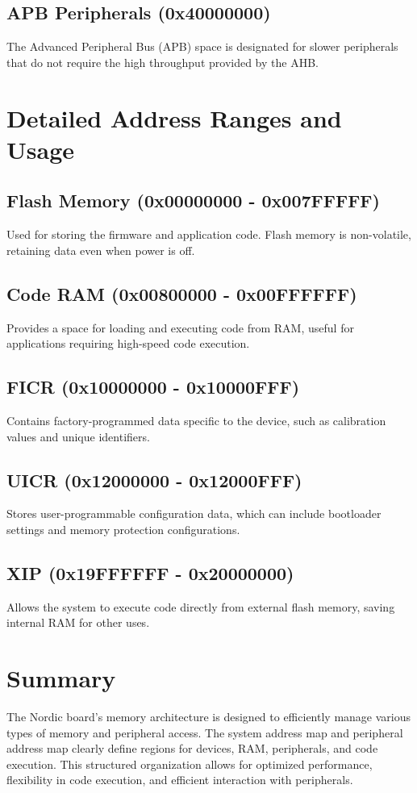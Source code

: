 \documentclass{Configuration_Files/PoliMi3i_thesis}
\begin{document}
\subsection{APB Peripherals (0x40000000)}
The Advanced Peripheral Bus (APB) space is designated for slower peripherals that do not require the high throughput provided by the AHB.

\section{Detailed Address Ranges and Usage}

\subsection{Flash Memory (0x00000000 - 0x007FFFFF)}
Used for storing the firmware and application code. Flash memory is non-volatile, retaining data even when power is off.

\subsection{Code RAM (0x00800000 - 0x00FFFFFF)}
Provides a space for loading and executing code from RAM, useful for applications requiring high-speed code execution.

\subsection{FICR (0x10000000 - 0x10000FFF)}
Contains factory-programmed data specific to the device, such as calibration values and unique identifiers.

\subsection{UICR (0x12000000 - 0x12000FFF)}
Stores user-programmable configuration data, which can include bootloader settings and memory protection configurations.

\subsection{XIP (0x19FFFFFF - 0x20000000)}
Allows the system to execute code directly from external flash memory, saving internal RAM for other uses.

\section{Summary}
The Nordic board's memory architecture is designed to efficiently manage various types of memory and peripheral access. The system address map and peripheral address map clearly define regions for devices, RAM, peripherals, and code execution. This structured organization allows for optimized performance, flexibility in code execution, and efficient interaction with peripherals.
\end{document}
